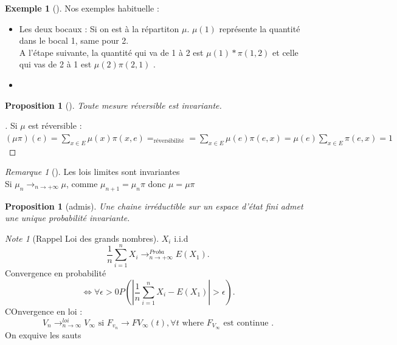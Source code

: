 \documentclass{article}
\theoremstyle{plain}%
\newtheorem{prop}[thm]{Proposition}
\theoremstyle{definition}
\newtheorem{exmp}{Exemple}[section]
\theoremstyle{remark}
\newtheorem*{rem}{Remarque}
\newtheorem*{note}{Note}
\begin{document}
\begin{exmp}[]
	Nos exemples habituelle : \begin{itemize}
		\item Les deux bocaux : Si on est à la répartiton $ \mu  $. $ \mu(1)$ représente la quantité dans le bocal 1, same pour 2. \\ A l'étape suivante, la quantité qui va de 1 à 2 est $ \mu (1) * \pi (1,2)$ et celle qui vas de 2 à 1 est $ \mu (2)\pi (2,1) $ .
		\item  
	\end{itemize}
\end{exmp}

\begin{prop}[]
	Toute mesure réversible est invariante. 
\end{prop}

\begin{proof}[]
	Si $ \mu  $ est réversible : $ \displaystyle (\mu \pi)(e) = \sum_{x \in E}^{}\mu (x) \pi (x,e) =_{\text{réversibilité}} = \sum_{x \in E}^{} \mu (e) \pi (e,x) = \mu (e) \sum_{x \in E}^{} \pi (e,x) = 1$  
\end{proof}

\begin{rem}[]
	Les lois limites sont invariantes \\
	Si $ \displaystyle \mu _{n} \rightarrow_{n \rightarrow + \infty } \mu  $, comme $ \mu _{n+1}  = \mu _{n}  \pi  $ donc $ \mu = \mu \pi $
\end{rem}
\begin{prop}[admis]
	Une chaine irréductible sur un espace d'état fini admet une unique probabilité invariante.
\end{prop}

\begin{note}[Rappel Loi des grands nombres]
	$ X_i $ i.i.d 
	\[
		\frac{1}{n}\sum_{i=1}^{n}X_i \longrightarrow ^{Proba}_{n \to + \infty } E(X_1)
	.\]
	Convergence en probabilité
	\[
		\Leftrightarrow \forall \epsilon > 0 P(\left| \frac{1}{n} \sum_{i=1}^{n}X_i - E(X_1)\right| > \epsilon)
	.\]
	COnvergence en loi : 
	\[
		V_n \to _{n \to \infty } ^{loi} V_{\infty} \text{ si } F_{v_n} \to F{V_{\infty }}(t), \forall t \text{ where } F_{V_{\infty}} \text{ est continue }
	.\]
	On exquive les sauts 
\end{note}
\end{document}
